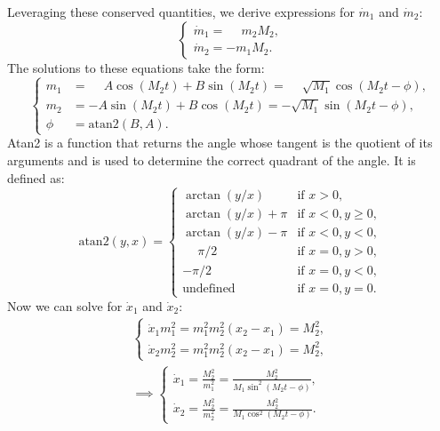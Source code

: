 \documentclass[english,master]{liumaiex}
\theoremstyle{plain}
\theoremstyle{definition}
\begin{document}
%
Leveraging these conserved quantities, we derive expressions for $\dot{m}_1$ and $\dot{m}_2$:
\begin{equation}
\left\{ \begin{aligned}
	\dot{m}_1 = \phantom{-}m_2M_2, \\
	\dot{m}_2 = -m_1M_2.
\end{aligned} \right.
\end{equation}
%
The solutions to these equations take the form:
\begin{equation}
\left\{ \begin{aligned}
	m_1 &= \phantom{-}A \cos(M_2t) + B\sin(M_2t) = \phantom{-}\sqrt{M_1} \cos(M_2t - \phi), \\
	m_2 &= -A \sin(M_2t) + B\cos(M_2t) = -\sqrt{M_1} \sin(M_2t - \phi), \\
	\phi &= \text{atan2}(B, A).
\end{aligned} \right.
\end{equation}
Atan2 is a function that returns the angle whose tangent is the quotient of its arguments and is used to determine the correct quadrant of the angle. It is defined as:
\begin{equation}
	\text{atan2}(y, x) = \begin{cases}
		\arctan(y/x) & \text{if } x > 0, \\
		\arctan(y/x) + \pi & \text{if } x < 0, y \geq 0, \\
		\arctan(y/x) - \pi & \text{if } x < 0, y < 0, \\
		\phantom{-}\pi/2 & \text{if } x = 0, y > 0, \\
		-\pi/2 & \text{if } x = 0, y < 0, \\
		\text{undefined} & \text{if } x = 0, y = 0.
	\end{cases}
\end{equation}
%
Now we can solve for $\dot{x}_1$ and $\dot{x}_2$:
\begin{align}
\left\{ \begin{aligned}
	\dot{x}_1m_1^2 = m_1^2m_2^2(x_2 - x_1) = M_2^2, \\
	\dot{x}_2m_2^2 = m_1^2m_2^2(x_2 - x_1) = M_2^2,
\end{aligned} \right. \\
\implies \left\{ \begin{aligned}
	\dot{x}_1 = \frac{M_2^2}{m_1^2} = \frac{M_2^2}{M_1\sin^2(M_2t - \phi)}, \\
	\dot{x}_2 = \frac{M_2^2}{m_2^2} = \frac{M_2^2}{M_1\cos^2(M_2t - \phi)}.
\end{aligned} \right.
\end{align}
\end{document}
